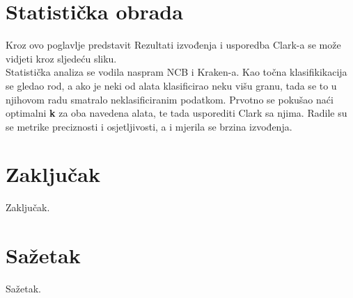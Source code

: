 \documentclass[times, utf8, seminar]{fer}
\begin{document}
\chapter{Statistička obrada}
Kroz ovo poglavlje predstavit 
Rezultati izvođenja i usporedba Clark-a se može vidjeti kroz sljedeću sliku.
\\Statistička analiza se vodila naspram NCB i Kraken-a. Kao točna klasifikikacija se gledao rod, a ako je neki od alata klasificirao neku višu granu, tada se to u njihovom radu smatralo neklasificiranim podatkom. Prvotno se pokušao naći optimalni \textbf{k} za oba navedena alata, te tada usporediti Clark sa njima. Radile su se metrike preciznosti i osjetljivosti, a i mjerila se brzina izvođenja.
\chapter{Zaključak}
Zaključak.




\chapter{Sažetak}
Sažetak.
\end{document}
